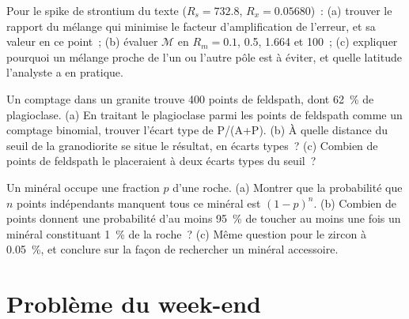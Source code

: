 \begin{exercise}[$\star\star\star$]\label{exo:b2:field-lab-methods-2:10}
Pour le spike de strontium du texte ($R_s = 732.8$, $R_x = 0.05680$)~: (a) trouver le rapport du mélange
qui minimise le facteur d'amplification de l'erreur, et sa valeur en ce point~; (b) évaluer $\mathcal M$ en
$R_m = 0.1$, 0.5, 1.664 et 100~; (c) expliquer pourquoi un mélange proche de l'un ou l'autre pôle est à
éviter, et quelle latitude l'analyste a en pratique.
\end{exercise}

\begin{exercise}[$\star\star\star$]\label{exo:b2:field-lab-methods-2:11}
Un comptage dans un granite trouve 400 points de feldspath, dont \qty{62}{\percent} de plagioclase. (a) En traitant le
plagioclase parmi les points de feldspath comme un comptage binomial, trouver l'écart type de
P/(A+P). (b) À quelle distance du seuil de la granodiorite se situe le résultat, en écarts types~? (c) Combien
de points de feldspath le placeraient à deux écarts types du seuil~?
\end{exercise}

\begin{exercise}[$\star\star\star$]\label{exo:b2:field-lab-methods-2:12}
Un minéral occupe une fraction $p$ d'une roche. (a) Montrer que la probabilité que $n$ points indépendants
manquent tous ce minéral est $(1-p)^n$. (b) Combien de points donnent une probabilité d'au moins \qty{95}{\percent}
de toucher au moins une fois un minéral constituant \qty{1}{\percent} de la roche~? (c) Même question pour le zircon à
\qty{0.05}{\percent}, et conclure sur la façon de rechercher un minéral accessoire.
\end{exercise}

\section*{Problème du week-end}

